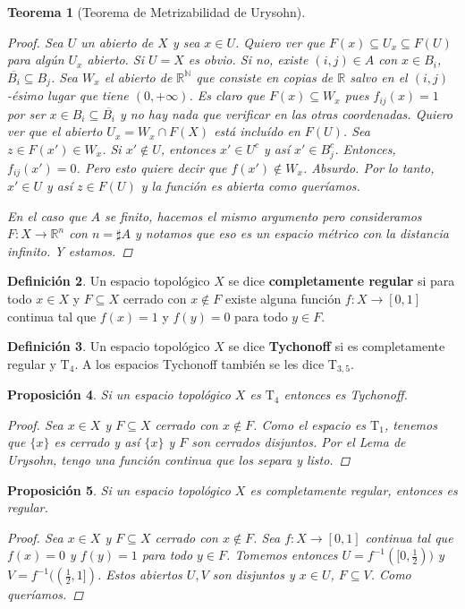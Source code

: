 \documentclass[12pt]{book}
\newtheorem{teo}{Teorema}[section]
\newtheorem{prop}[teo]{Proposición}
\theoremstyle{definition}
\newtheorem{defn}[teo]{Definición}
\newcommand{\RR}{\mathbb{R}}      %
\newcommand{\NN}{\mathbb{N}}
\begin{document}
\begin{teo}[Teorema de Metrizabilidad de Urysohn]
\begin{proof}
Sea $U$ un abierto de $X$ y sea $x\in U$. Quiero ver que $F(x)\subseteq U_x\subseteq F(U)$ para algún $U_x$ abierto. Si $U=X$ es obvio. Si no, existe $(i,j)\in A$ con $x\in B_i$, $\overline{B_i}\subseteq B_j$. Sea $W_x$ el abierto de $\RR^\NN$ que consiste en copias de $\RR$ salvo en el $(i,j)$-ésimo lugar que tiene $(0,+\infty)$. Es claro que $F(x)\subseteq W_x$ pues $f_{ij}(x)=1$ por ser $x\in B_i\subseteq\overline{B_i}$ y no hay nada que verificar en las otras coordenadas. Quiero ver que el abierto $U_x = W_x\cap F(X)$ está incluído en $F(U)$. Sea $z\in F(x')\in W_x$. Si $x'\notin U$, entonces $x'\in U^c$ y así $x'\in B_j^c$. Entonces, $f_{ij}(x')=0$. Pero esto quiere decir que $f(x')\notin W_x$. Absurdo. Por lo tanto, $x'\in U$ y así $z\in F(U)$ y la función es abierta como queríamos.

En el caso que $A$ se finito, hacemos el mismo argumento pero consideramos $F:X\to \RR^n$ con $n=\sharp A$ y notamos que eso es un espacio métrico con la distancia infinito. Y estamos.
\end{proof}
\end{teo}

\begin{defn}
Un espacio topológico $X$ se dice \textbf{completamente regular} si para todo $x\in X$ y $F\subseteq X$ cerrado con $x\notin F$ existe alguna función $f:X\to [0,1]$ continua tal que $f(x)=1$ y $f(y)=0$ para todo $y\in F$.
\end{defn}

\begin{defn}
Un espacio topológico $X$ se dice \textbf{Tychonoff} si es completamente regular y $\mathrm{T}_4$. A los espacios Tychonoff también se les dice $\mathrm{T}_{3,5}$.
\end{defn}

\begin{prop}
Si un espacio topológico $X$ es $\mathrm{T}_4$ entonces es Tychonoff.
\begin{proof}
Sea $x\in X$ y $F\subseteq X$ cerrado con $x\notin F$. Como el espacio es $\mathrm{T}_1$, tenemos que $\{x\}$ es cerrado y así $\{x\}$ y $F$ son cerrados disjuntos. Por el Lema de Urysohn, tengo una función continua que los separa y listo.
\end{proof}
\end{prop}

\begin{prop}
Si un espacio topológico $X$ es completamente regular, entonces es regular.
\begin{proof}
Sea $x\in X$ y $F\subseteq X$ cerrado con $x\notin F$. Sea $f:X\to [0,1]$ continua tal que $f(x)=0$ y $f(y)=1$ para todo $y\in F$. Tomemos entonces $U = f^{-1}([0,\frac{1}{2}))$ y $V=f^{-1}((\frac{1}{2},1])$. Estos abiertos $U,V$ son disjuntos y $x\in U$, $F\subseteq V$. Como queríamos.
\end{proof}
\end{prop}
\end{document}
